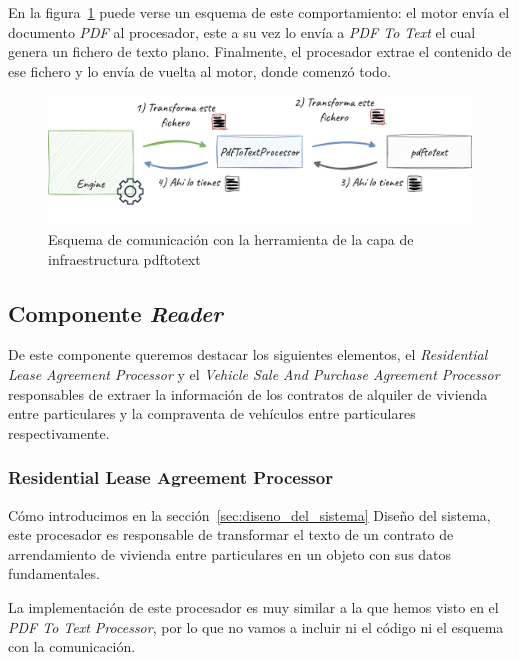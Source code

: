 En la figura~\ref{fig:chapter_4.4.generator_component_pdf_to_text_processor} puede verse un esquema de este
comportamiento: el motor envía el documento \textit{PDF} al procesador, este a su vez lo envía a \textit{PDF To Text}
el cual genera un fichero de texto plano.
Finalmente, el procesador extrae el contenido de ese fichero y lo envía de vuelta al motor, donde comenzó todo.

\begin{figure}[ht]
    \begin{center}
        \includegraphics[width=\textwidth]{./chapter/4/images/chapter_4.4.generator_component_pdf_to_text_processor}
        \caption{Esquema de comunicación con la herramienta de la capa de infraestructura pdftotext}
        \label{fig:chapter_4.4.generator_component_pdf_to_text_processor}
    \end{center}
\end{figure}

\subsection*{Componente \textit{Reader}}

De este componente queremos destacar los siguientes elementos, el \textit{Residential Lease Agreement Processor} y el
\textit{Vehicle Sale And Purchase Agreement Processor} responsables de extraer la información de los contratos de
alquiler de vivienda entre particulares y la compraventa de vehículos entre particulares respectivamente.

\subsubsection*{Residential Lease Agreement Processor}

Cómo introducimos en la sección~\ref{sec:diseno_del_sistema} Diseño del sistema, este procesador es responsable de
transformar el texto de un contrato de arrendamiento de vivienda entre particulares en un objeto con sus datos
fundamentales.

La implementación de este procesador es muy similar a la que hemos visto en el \textit{PDF To Text Processor}, por lo
que no vamos a incluir ni el código ni el esquema con la comunicación.

